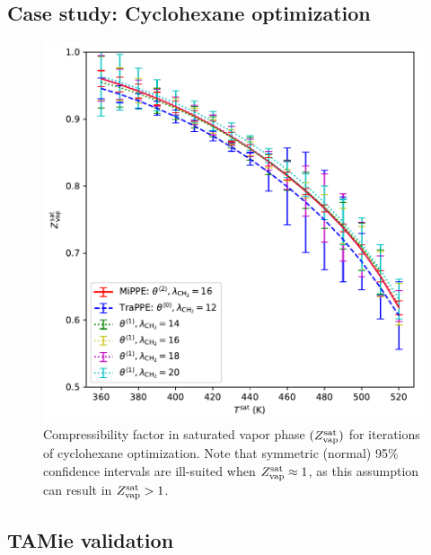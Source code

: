 \documentclass[journal=jctc,manuscript=article]{achemso}
\begin{document}
\newpage
\clearpage

\subsection{Case study: Cyclohexane optimization}

\begin{figure}[htb!]
	\centering
	\includegraphics[width=6.4in]{Compressibility_factor_CYC6_iterations.pdf}
	\caption{Compressibility factor in saturated vapor phase $(Z^{\rm sat}_{\rm vap})$ for iterations of cyclohexane optimization. Note that symmetric (normal) 95\% confidence intervals are ill-suited when $Z^{\rm sat}_{\rm vap} \approx 1$, as this assumption can result in $Z^{\rm sat}_{\rm vap} > 1$.}
	\label{SI fig:Z_CYC6}
\end{figure}

\newpage
\clearpage

\subsection{TAMie validation}
\end{document}
